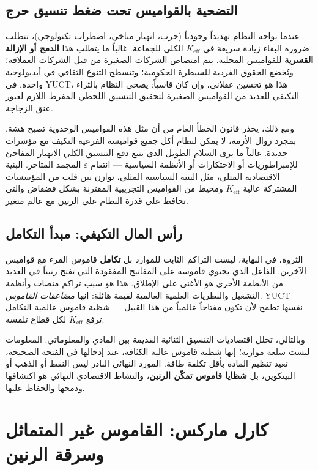 \documentclass[12pt,a4paper]{article}
\newcommand{\Keff}{K_{\mathrm{eff}}}
\begin{document}
	\subsection{التضحية بالقواميس تحت ضغط تنسيق حرج}
	
	عندما يواجه النظام تهديداً وجودياً (حرب، انهيار مناخي، اضطراب تكنولوجي)، تتطلب ضرورة البقاء زيادة سريعة في \(\Keff\) الكلي للجماعة. غالباً ما يتطلب هذا \textbf{الدمج أو الإزالة القسرية} للقواميس المحلية. يتم امتصاص الشركات الصغيرة من قبل الشركات العملاقة؛ وتُخضع الحقوق الفردية للسيطرة الحكومية؛ وتتسطح التنوع الثقافي في أيديولوجية واحدة. في YUCT، هذا هو تحسين عقلاني، وإن كان قاسياً: يضحي النظام بالثراء التكيفي للعديد من القواميس الصغيرة لتحقيق التنسيق اللحظي المفرط اللازم لعبور عنق الزجاجة.
	
	ومع ذلك، يحذر قانون الخطأ العام من أن مثل هذه القواميس الوحدوية تصبح هشة. بمجرد زوال الأزمة، لا يمكن لنظام أكل جميع قواميسه الفرعية التكيف مع مؤشرات جديدة. غالباً ما يرى السلام الطويل الذي يتبع دفع التنسيق الكلي الانهيار المفاجئ للإمبراطوريات أو الاحتكارات أو الأنظمة السياسية — انتقام \(\varepsilon\) المجمد المتأخر. البنية الاقتصادية المثلى، مثل البنية السياسية المثلى، توازن بين قلب من المؤسسات المشتركة عالية \(\Keff\) ومحيط من القواميس التجريبية المقترنة بشكل فضفاض والتي تحافظ على قدرة النظام على الرنين مع عالم متغير.
	
	\subsection{رأس المال التكيفي: مبدأ التكامل}
	
	الثروة، في النهاية، ليست التراكم الثابت للموارد بل \textbf{تكامل} قاموس المرء مع قواميس الآخرين. الفاعل الذي يحتوي قاموسه على المفاتيح المفقودة التي تفتح رنيناً في العديد من الأنظمة الأخرى هو الأغنى على الإطلاق. هذا هو سبب تراكم منصات وأنظمة التشغيل والنظريات العلمية العالمية لقيمة هائلة: إنها \emph{مضاعفات القاموس}. YUCT نفسها تطمح لأن تكون مفتاحاً عالمياً من هذا القبيل — شظية قاموس عالمية التكامل ترفع \(\Keff\) لكل قطاع تلمسه.
	
	وبالتالي، تحلل اقتصاديات التنسيق الثنائية القديمة بين المادي والمعلوماتي. المعلومات ليست سلعة موازية؛ إنها شظية قاموس عالية الكثافة، عند إدخالها في الفتحة الصحيحة، تعيد تنظيم المادة بأقل تكلفة طاقة. المورد النهائي النادر ليس النفط أو الذهب أو البيتكوين، بل \textbf{شظايا قاموس تمكّن الرنين}، والنشاط الاقتصادي النهائي هو اكتشافها ودمجها والحفاظ عليها.
	
	\section{كارل ماركس: القاموس غير المتماثل وسرقة الرنين}
	\label{sec:marx}
	
\end{document}
